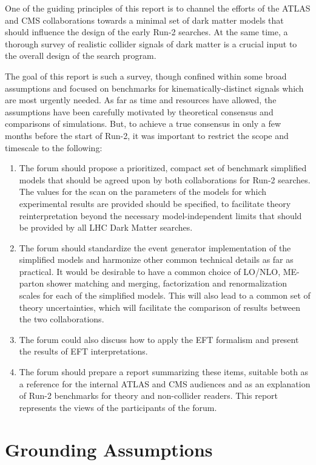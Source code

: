 One of the guiding principles of this report is to channel the efforts
of the ATLAS and CMS collaborations towards a minimal set of dark
matter models that should influence the design of the early Run-2
searches. At the same time, a thorough survey of realistic collider
signals of dark matter is a crucial input to the overall design of the
search program.

The goal of this report is such a survey, though confined within some
broad assumptions and focused on benchmarks for kinematically-distinct
signals which are most urgently needed. As far as time and resources
have allowed, the assumptions have been carefully motivated by
theoretical consensus and comparisons of simulations. But, to achieve a
true consensus in only a few months before the start of Run-2, it was
important to restrict the scope and timescale to the following:

\begin{enumerate}
\item The forum should propose a prioritized, compact set of benchmark
  simplified models that should be agreed upon by both collaborations for
  Run-2 searches. The values for the scan on the parameters of the models for which
  experimental results are provided should be specified, to facilitate theory reinterpretation 
  beyond the necessary model-independent limits that 
  should be provided by all LHC Dark Matter searches. 
\item The forum should standardize the event generator implementation
  of the simplified models and harmonize other common technical
  details as far as practical. It
  would be desirable to have a common choice of LO/NLO, ME-parton
  shower matching and merging, factorization and renormalization
  scales for each of the simplified models. This will also lead to a
  common set of theory uncertainties, which will facilitate the
  comparison of results between the two collaborations.
\item The forum could also discuss how to apply the
  EFT formalism and present the results of EFT
  interpretations.
\item The forum should prepare a report summarizing these items,
  suitable both as a reference for the internal ATLAS and CMS
  audiences and as an explanation of Run-2 benchmarks for theory and non-collider
  readers. This report represents the views of the participants of the
  forum.
\end{enumerate}

\section{Grounding Assumptions}

